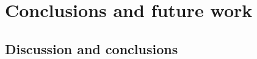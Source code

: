 \chapter{Conclusions and future work}
\label{conclusions}





\section{Discussion and conclusions}
\label{discussion}

